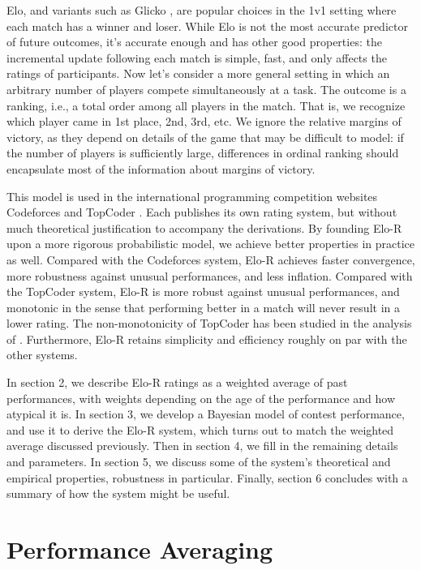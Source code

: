 \documentclass{article}
\begin{document}
Elo, and variants such as Glicko \cite{glicko}, are popular choices in the 1v1 setting where each match has a winner and loser. While Elo is not the most accurate predictor of future outcomes, it's accurate enough and has other good properties: the incremental update following each match is simple, fast, and only affects the ratings of participants. Now let's consider a more general setting in which an arbitrary number of players compete simultaneously at a task. The outcome is a ranking, i.e., a total order among all players in the match. That is, we recognize which player came in 1st place, 2nd, 3rd, etc. We ignore the relative margins of victory, as they depend on details of the game that may be difficult to model: if the number of players is sufficiently large, differences in ordinal ranking should encapsulate most of the information about margins of victory.

This model is used in the international programming competition websites Codeforces \cite{Codeforces} and TopCoder \cite{TopCoder}. Each publishes its own rating system, but without much theoretical justification to accompany the derivations. By founding Elo-R upon a more rigorous probabilistic model, we achieve better properties in practice as well. Compared with the Codeforces system, Elo-R achieves faster convergence, more robustness against unusual performances, and less inflation. Compared with the TopCoder system, Elo-R is more robust against unusual performances, and monotonic in the sense that performing better in a match will never result in a lower rating. The non-monotonicity of TopCoder has been studied in the analysis of \cite{forivsektheoretical}. Furthermore, Elo-R retains simplicity and efficiency roughly on par with the other systems.

In section 2, we describe Elo-R ratings as a weighted average of past performances, with weights depending on the age of the performance and how atypical it is. In section 3, we develop a Bayesian model of contest performance, and use it to derive the Elo-R system, which turns out to match the weighted average discussed previously. Then in section 4, we fill in the remaining details and parameters. In section 5, we discuss some of the system's theoretical and empirical properties, robustness in particular. Finally, section 6 concludes with a summary of how the system might be useful.

\section{Performance Averaging}
\end{document}
